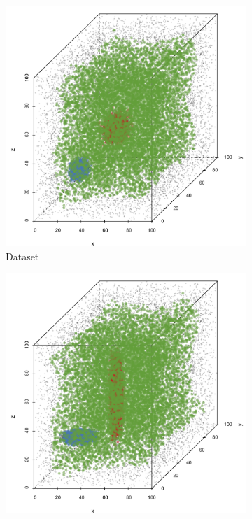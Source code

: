 	\begin{figure}
		\centering
		\begin{subfigure}{0.23\textwidth}
			\centering
			\includegraphics[keepaspectratio=true, width=\textwidth, height=0.23\textheight]{discussion/img/ferdosi_2_abs_error_mbeSmallerThansambe}
			\caption{Dataset \ferdosiTwo}
			\label{fig:discussion:performance:mbeLowerError:ferdosi2}
		\end{subfigure}
		\begin{subfigure}{0.23\textwidth}
			\centering
			\includegraphics[keepaspectratio=true, width=\textwidth, height=0.23\textheight]{discussion/img/baakman_2_abs_error_mbeSmallerThansambe}

\end{subfigure}
\end{figure}
